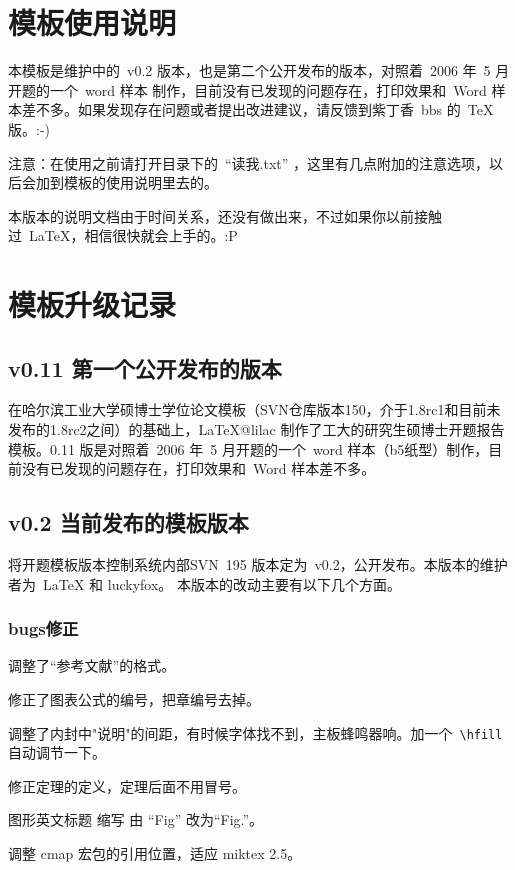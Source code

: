 \section{模板使用说明}

本模板是维护中的~v0.2 版本，也是第二个公开发布的版本，对照着~2006 年~5 月开题的一个~word 样本
制作，目前没有已发现的问题存在，打印效果和~Word 样本差不多。如果发现存在问题或者提出改进建议，请反馈到紫丁香~bbs 的~TeX 版。:-)

注意：在使用之前请打开目录下的~``读我.txt'' ，这里有几点附加的注意选项，以后会加到模板的使用说明里去的。

本版本的说明文档由于时间关系，还没有做出来，不过如果你以前接触过~LaTeX，相信很快就会上手的。:P

\section{模板升级记录}
\subsection{v0.11 第一个公开发布的版本}
在哈尔滨工业大学硕博士学位论文模板（SVN仓库版本150，介于1.8rc1和目前未发布的1.8rc2之间）的基础上，LaTeX@lilac
制作了工大的研究生硕博士开题报告模板。0.11 版是对照着~2006 年~5 月开题的一个~word 样本（b5纸型）制作，目前没有已发现的问题存在，打印效果和~Word 样本差不多。

\subsection{v0.2 当前发布的模板版本}
将开题模板版本控制系统内部SVN~195 版本定为~v0.2，公开发布。本版本的维护者为~LaTeX 和 luckyfox。 本版本的改动主要有以下几个方面。

\subsubsection{bugs修正}
\begin{hitlist}
  \item 调整了``参考文献''的格式。
  \item 修正了图表公式的编号，把章编号去掉。
  \item 调整了内封中"说明"的间距，有时候字体找不到，主板蜂鸣器响。加一个~\verb|\hfill| 自动调节一下。
  \item 修正定理的定义，定理后面不用冒号。
  \item 图形英文标题 缩写 由 ``Fig'' 改为``Fig.''。
  \item 调整 cmap 宏包的引用位置，适应 miktex 2.5。
\end{hitlist}


